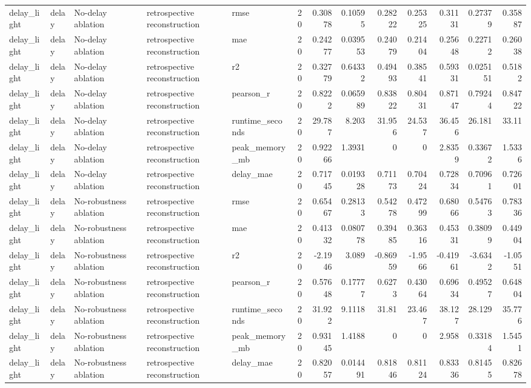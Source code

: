 \begin{table}[!htbp]
{{\begin{tabular}{lllllrrrrrrrr}
delay_light & delay & No-delay ablation & retrospective reconstruction & rmse & 20 & 0.30878 & 0.10595 & 0.28222 & 0.25325 & 0.31131 & 0.27379 & 0.35887 \\
delay_light & delay & No-delay ablation & retrospective reconstruction & mae & 20 & 0.24277 & 0.039553 & 0.24079 & 0.21404 & 0.25648 & 0.22712 & 0.26038 \\
delay_light & delay & No-delay ablation & retrospective reconstruction & r2 & 20 & 0.32779 & 0.64332 & 0.49493 & 0.38541 & 0.59331 & 0.025151 & 0.5182 \\
delay_light & delay & No-delay ablation & retrospective reconstruction & pearson_r & 20 & 0.8222 & 0.065989 & 0.83822 & 0.80431 & 0.87147 & 0.79244 & 0.84722 \\
delay_light & delay & No-delay ablation & retrospective reconstruction & runtime_seconds & 20 & 29.787 & 8.203 & 31.956 & 24.537 & 36.456 & 26.181 & 33.11 \\
delay_light & delay & No-delay ablation & retrospective reconstruction & peak_memory_mb & 20 & 0.92266 & 1.3931 & 0 & 0 & 2.8359 & 0.33672 & 1.5336 \\
delay_light & delay & No-delay ablation & retrospective reconstruction & delay_mae & 20 & 0.71745 & 0.019328 & 0.71173 & 0.70424 & 0.72834 & 0.70961 & 0.72601 \\
delay_light & delay & No-robustness ablation & retrospective reconstruction & rmse & 20 & 0.65467 & 0.28133 & 0.54278 & 0.47299 & 0.68066 & 0.54763 & 0.78336 \\
delay_light & delay & No-robustness ablation & retrospective reconstruction & mae & 20 & 0.41332 & 0.080778 & 0.39485 & 0.36316 & 0.45331 & 0.38099 & 0.44904 \\
delay_light & delay & No-robustness ablation & retrospective reconstruction & r2 & 20 & -2.1946 & 3.089 & -0.86959 & -1.9566 & -0.41961 & -3.6342 & -1.0551 \\
delay_light & delay & No-robustness ablation & retrospective reconstruction & pearson_r & 20 & 0.57648 & 0.17777 & 0.6273 & 0.43064 & 0.69634 & 0.49527 & 0.64804 \\
delay_light & delay & No-robustness ablation & retrospective reconstruction & runtime_seconds & 20 & 31.922 & 9.1118 & 31.81 & 23.467 & 38.127 & 28.129 & 35.776 \\
delay_light & delay & No-robustness ablation & retrospective reconstruction & peak_memory_mb & 20 & 0.93145 & 1.4188 & 0 & 0 & 2.958 & 0.33184 & 1.5451 \\
delay_light & delay & No-robustness ablation & retrospective reconstruction & delay_mae & 20 & 0.82057 & 0.014491 & 0.81846 & 0.81124 & 0.83336 & 0.81455 & 0.82678 \\

\end{tabular}}}
\end{table}
